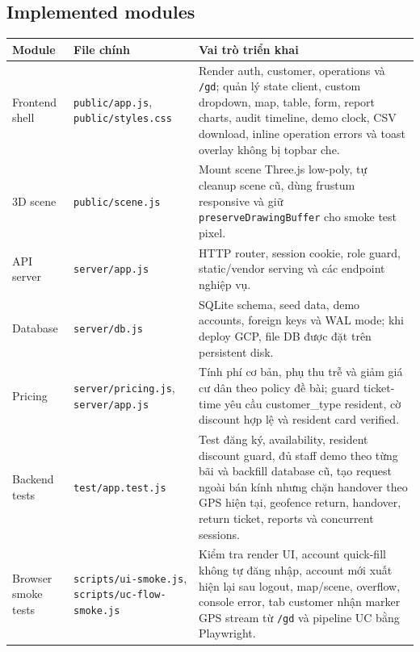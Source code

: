 \subsection{Implemented modules}
\begin{longtable}{P{0.22\textwidth}P{0.28\textwidth}P{0.40\textwidth}}
\toprule
\textbf{Module} & \textbf{File chính} & \textbf{Vai trò triển khai} \\
\midrule
Frontend shell & \texttt{public/app.js}, \texttt{public/styles.css} & Render auth, customer, operations và \texttt{/gd}; quản lý state client, custom dropdown, map, table, form, report charts, audit timeline, demo clock, CSV download, inline operation errors và toast overlay không bị topbar che. \\
3D scene & \texttt{public/scene.js} & Mount scene Three.js low-poly, tự cleanup scene cũ, dùng frustum responsive và giữ \texttt{preserveDrawingBuffer} cho smoke test pixel. \\
API server & \texttt{server/app.js} & HTTP router, session cookie, role guard, static/vendor serving và các endpoint nghiệp vụ. \\
Database & \texttt{server/db.js} & SQLite schema, seed data, demo accounts, foreign keys và WAL mode; khi deploy GCP, file DB được đặt trên persistent disk. \\
Pricing & \texttt{server/pricing.js}, \texttt{server/app.js} & Tính phí cơ bản, phụ thu trễ và giảm giá cư dân theo policy đề bài; guard ticket-time yêu cầu customer\_type resident, cờ discount hợp lệ và resident card verified. \\
Backend tests & \texttt{test/app.test.js} & Test đăng ký, availability, resident discount guard, đủ staff demo theo từng bãi và backfill database cũ, tạo request ngoài bán kính nhưng chặn handover theo GPS hiện tại, geofence return, handover, return ticket, reports và concurrent sessions. \\
Browser smoke tests & \texttt{scripts/ui-smoke.js}, \texttt{scripts/uc-flow-smoke.js} & Kiểm tra render UI, account quick-fill không tự đăng nhập, account mới xuất hiện lại sau logout, map/scene, overflow, console error, tab customer nhận marker GPS stream từ \texttt{/gd} và pipeline UC bằng Playwright. \\
\bottomrule
\end{longtable}

